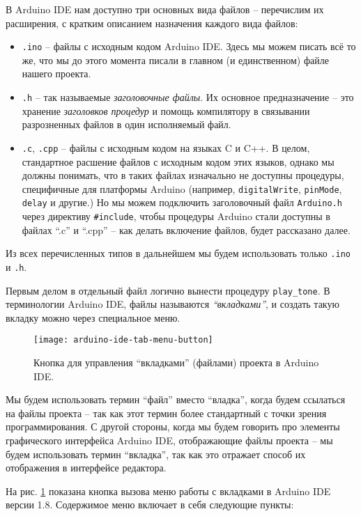 \documentclass[../sparc.tex]{subfiles}
\begin{document}
В Arduino IDE нам доступно три основных вида файлов -- перечислим их расширения,
с кратким описанием назначения каждого вида файлов:
\begin{itemize}
\item \texttt{.ino} -- файлы с исходным кодом Arduino IDE.  Здесь мы можем писать
  всё то же, что мы до этого момента писали в главном (и единственном) файле
  нашего проекта.
\item \texttt{.h} -- так называемые \emph{заголовочные файлы}.  Их основное
  предназначение -- это хранение \emph{заголовков процедур} и помощь компилятору
  в связывании разрозненных файлов в один исполняемый файл.
\item \texttt{.с}, \texttt{.cpp} -- файлы с исходным кодом на языках C и C++. В
  целом, стандартное расшение файлов с исходным кодом этих языков, однако мы
  должны понимать, что в таких файлах изначально не доступны процедуры,
  специфичные для платформы Arduino (например, \texttt{digitalWrite},
  \texttt{pinMode}, \texttt{delay} и другие.)  Но мы можем
  подключить заголовочный файл \texttt{Arduino.h} через директиву
  \texttt{#include}, чтобы процедуры Arduino стали доступны в файлах
  ``.c'' и ``.cpp'' -- как делать включение файлов, будет рассказано далее.
\end{itemize}

Из всех перечисленных типов в дальнейшем мы будем использовать только
\texttt{.ino} и \texttt{.h}.

Первым делом в отдельный файл логично вынести процедуру
\texttt{play_tone}.  В терминологии Arduino IDE, файлы называются
\emph{``вкладками''}, и создать такую вкладку можно через специальное меню.

\begin{figure}[ht]
  \centering
  \texttt{[image: arduino-ide-tab-menu-button]}
  \caption{Кнопка для управления ``вкладками'' (файлами) проекта в Arduino IDE.}
  \label{fig:arduino-ide-tab-menu-button}
\end{figure}

Мы будем использовать термин ``файл'' вместо ``владка'', когда будем ссылаться
на файлы проекта -- так как этот термин более стандартный с точки зрения
программирования.  С другой стороны, когда мы будем говорить про элементы
графического интерфейса Arduino IDE, отображающие файлы проекта -- мы будем
использовать термин ``вкладка'', так как это отражает способ их отображения в
интерфейсе редактора.

На рис. \ref{fig:arduino-ide-tab-menu-button} показана кнопка вызова меню работы
с вкладками в Arduino IDE версии 1.8.  Содержимое меню включает в себя следующие
пункты:
\end{document}
